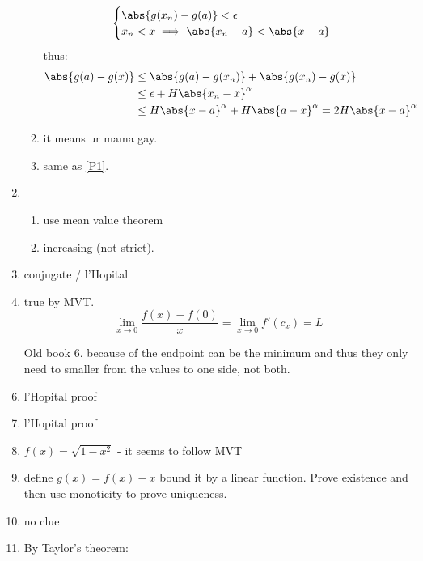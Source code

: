 \begin{enumerate}
\begin{enumerate}
\begin{equation}
\begin{cases}
                            \abs{g(x_n)- g(a)} < \epsilon               \\
                            x_n < x \implies \abs{x_n -a} < \abs{x - a} \\
                        \end{cases}
                    \end{equation}
                    thus:
                    \begin{align}
                        \abs{g(a) - g(x)} & \leq \abs{g(a) - g(x_n)} + \abs{g(x_n) - g(x)}                       \\
                                          & \leq \epsilon + H\abs{x_n - x}^\alpha                                \\
                                          & \leq H\abs{x - a}^\alpha + H\abs{a-x}^\alpha = 2H \abs{x - a}^\alpha
                    \end{align}
              \item
                    it means ur mama gay.
              \item
                    same as \cref{P1}.
          \end{enumerate}
    \item
          \begin{enumerate}
              \item use mean value theorem
              \item increasing (not strict).
          \end{enumerate}
    \item conjugate / l'Hopital
    \item true by MVT.
          \begin{equation}
              \lim_{x \to 0}{\dfrac{f(x) - f(0)}{x}} = \lim_{x \to 0}{f'(c_x)} = L
          \end{equation}
    \item [Old book 6.] because of the endpoint can be the minimum and thus they only need to smaller from the values to one side, not both.
    \item l'Hopital proof
    \item l'Hopital proof
    \item \(f(x) = \sqrt{1 - x^2}\) - it seems to follow MVT
    \item define \(g(x) = f(x) - x\) bound it by a linear function. Prove existence and then use monoticity to prove uniqueness.
    \item no clue
    \item By Taylor's theorem:

\end{enumerate}
